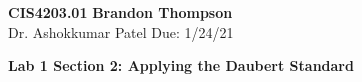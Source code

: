 \noindent
\textbf{CIS4203.01} \hfill \textbf{Brandon Thompson} \\
\normalsize Dr. Ashokkumar Patel \hfill Due: 1/24/21\\

\begin{center}
\textbf{Lab 1 Section 2: Applying the Daubert Standard}
\end{center}